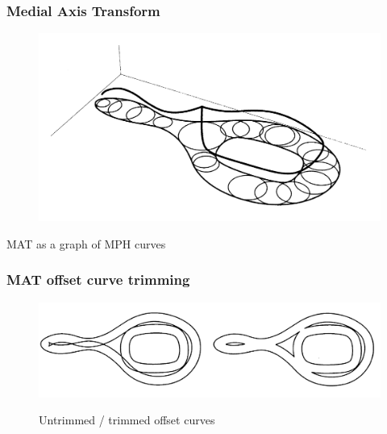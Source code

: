\documentclass{beamer}
\begin{document}
\begin{frame}
\frametitle{Medial Axis Transform}

\begin{figure}
\centering
\includegraphics[width=\textwidth]{mat_mph.png}
\end{figure}

MAT as a graph of MPH curves
\end{frame}

\begin{frame}
\frametitle{MAT offset curve trimming}

\begin{figure}
\centering
\includegraphics[width=\textwidth]{untrimmed_trimmed.png}

Untrimmed / trimmed offset curves
\end{figure}

\end{frame}
\end{document}

